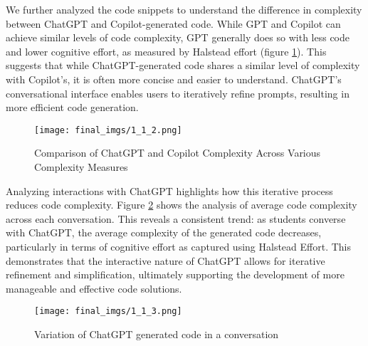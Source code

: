 We further analyzed the code snippets to understand the difference in complexity between ChatGPT and Copilot-generated code. While GPT and Copilot can achieve similar levels of code complexity, GPT generally does so with less code and lower cognitive effort, as measured by Halstead effort (figure \ref{fig:fig1.1.2}). This suggests that while ChatGPT-generated code shares a similar level of complexity with Copilot's, it is often more concise and easier to understand. ChatGPT's conversational interface enables users to iteratively refine prompts, resulting in more efficient code generation. 


\begin{figure}[t]
    \centering
    \texttt{[image: final\_imgs/1\_1\_2.png]}
    \caption{Comparison of ChatGPT and Copilot Complexity Across Various Complexity Measures}
    \label{fig:fig1.1.2}
\end{figure}

Analyzing interactions with ChatGPT highlights how this iterative process reduces code complexity. Figure \ref{fig:fig1.1.3} shows the analysis of average code complexity across each conversation. This reveals a consistent trend:  as students converse with ChatGPT, the average complexity of the generated code decreases, particularly in terms of cognitive effort as captured using Halstead Effort. This demonstrates that the interactive nature of ChatGPT allows for iterative refinement and simplification, ultimately supporting the development of more manageable and effective code solutions.  

\begin{figure}[t]
    \centering
    \texttt{[image: final\_imgs/1\_1\_3.png]}
    \caption{Variation of ChatGPT generated code in a conversation}
    \label{fig:fig1.1.3}
\end{figure}




